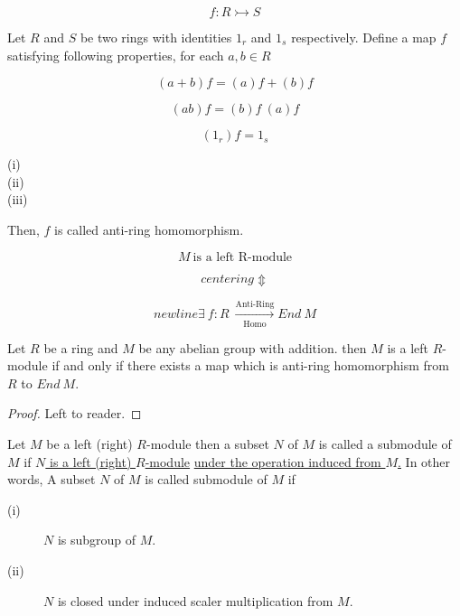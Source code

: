 \[
f : R \rightarrowtail S 
\]

\begin{definition}
	Let $R$ and $S$ be two rings with identities $1_r$ and $1_s$ respectively. Define a map $f$
	 satisfying following properties, for each $a , b \in R$ \newline

\[
(a+b)f = (a)f +(b)f 
\]

\[
(ab)f  = (b)f\ (a)f 
\]

\[
(1_r)f = 1_s 
\]

\begin{description}
		\item[(i)] 
		\item[(ii)] 
		\item[(iii)] 
  	
	
\end{description}
	 Then, $f$	is called anti-ring homomorphism.

\end{definition}

\[
M \ \text{is a left R-module} 
\]

\[
centering\Updownarrow 
\]

\[
newline\exists \ f: R \ \xrightarrow[\text{Homo}]{\text{Anti-Ring}} End \ M 
\]

\begin{thm}
	Let\marginnote{   } $R$ be a ring and $M$ be any abelian group with addition. then $M$ is a left $R$-module if and only if there exists a map which is anti-ring homomorphism from $R$ to $End \ M$.

\end{thm}

\begin{proof}
	Left to reader.

\end{proof}
\bigskip

\begin{definition}
	Let $M$ be a left (right) $R$-module then a subset $N$ of $M$ is called a submodule of $M$ if \underline{$N$ is a left (right) $R$-module} \underline{under the operation induced from $M$.}\newline \bigskip
	In other words, A subset $N$ of $M$ is called submodule of $M$ if

\begin{description}
		\item[(i)] $N$ is subgroup of $M$.
		\item[(ii)] $N$ is closed under induced scaler multiplication from $M$.
	
\end{description}

\end{definition}
\bigskip

